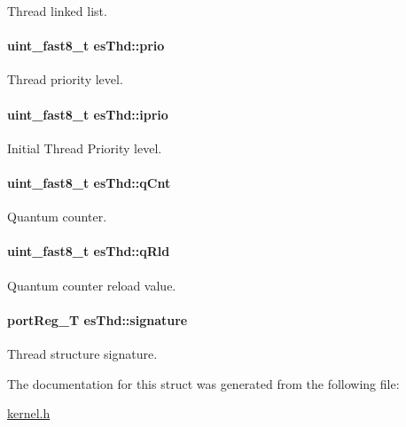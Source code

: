 Thread linked list. 

\hypertarget{structesThd_a8d1877cabc7d4e637f96f4b4d5b0da09}{
\paragraph[{prio}]{\setlength{\rightskip}{0pt plus 5cm}uint\-\_\-fast8\-\_\-t es\-Thd\-::prio}}\label{structesThd_a8d1877cabc7d4e637f96f4b4d5b0da09}


Thread priority level. 

\hypertarget{structesThd_ad21505b1a302ea26fd073f7f67da3e84}{
\paragraph[{iprio}]{\setlength{\rightskip}{0pt plus 5cm}uint\-\_\-fast8\-\_\-t es\-Thd\-::iprio}}\label{structesThd_ad21505b1a302ea26fd073f7f67da3e84}


Initial Thread Priority level. 

\hypertarget{structesThd_a5721e76b02321c6701e52a9788d9bf1e}{
\paragraph[{q\-Cnt}]{\setlength{\rightskip}{0pt plus 5cm}uint\-\_\-fast8\-\_\-t es\-Thd\-::q\-Cnt}}\label{structesThd_a5721e76b02321c6701e52a9788d9bf1e}


Quantum counter. 

\hypertarget{structesThd_a3c2c5e4b699e3c990e37000650f031ba}{
\paragraph[{q\-Rld}]{\setlength{\rightskip}{0pt plus 5cm}uint\-\_\-fast8\-\_\-t es\-Thd\-::q\-Rld}}\label{structesThd_a3c2c5e4b699e3c990e37000650f031ba}


Quantum counter reload value. 

\hypertarget{structesThd_a72e6c4660e827aae5a621894756a5eb2}{
\paragraph[{signature}]{\setlength{\rightskip}{0pt plus 5cm}port\-Reg\-\_\-\-T es\-Thd\-::signature}}\label{structesThd_a72e6c4660e827aae5a621894756a5eb2}


Thread structure signature. 



The documentation for this struct was generated from the following file\-:\begin{DoxyCompactItemize}
\item 
\hyperlink{kernel_8h}{kernel.\-h}\end{DoxyCompactItemize}
